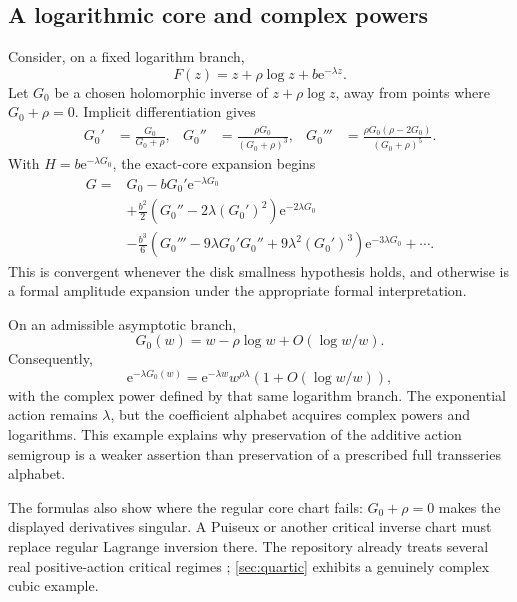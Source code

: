 \documentclass[11pt,a4paper]{article}
\numberwithin{equation}{section}
\theoremstyle{definition}
\theoremstyle{remark}
\newcommand{\e}{\mathrm e}
\begin{document}
\subsection{A logarithmic core and complex powers}

Consider, on a fixed logarithm branch,
\begin{equation}\label{eq:log-model}
 F(z)=z+\rho\log z+b\e^{-\lambda z}.
\end{equation}
Let $G_0$ be a chosen holomorphic inverse of $z+\rho\log z$,
away from points where $G_0+\rho=0$. Implicit differentiation gives
\begin{align}
 G_0'&=\frac{G_0}{G_0+\rho},&
 G_0''&=\frac{\rho G_0}{(G_0+\rho)^3},&
 G_0'''&=\frac{\rho G_0(\rho-2G_0)}{(G_0+\rho)^5}.
 \label{eq:log-core-derivatives}
\end{align}
With $H=b\e^{-\lambda G_0}$, the exact-core expansion begins
\begin{align}
 G={}&G_0-bG_0'\e^{-\lambda G_0}\nonumber\\
 &+\frac{b^2}{2}
       \left(G_0''-2\lambda(G_0')^2\right)
       \e^{-2\lambda G_0}\nonumber\\
 &-\frac{b^3}{6}
       \left(G_0'''-9\lambda G_0'G_0''
                    +9\lambda^2(G_0')^3\right)
       \e^{-3\lambda G_0}+\cdots .
 \label{eq:log-expansion}
\end{align}
This is convergent whenever the disk smallness hypothesis holds,
and otherwise is a formal amplitude expansion under the appropriate
formal interpretation.

On an admissible asymptotic branch,
\[
 G_0(w)=w-\rho\log w+O(\log w/w).
\]
Consequently,
\begin{equation}\label{eq:complex-power-core}
 \e^{-\lambda G_0(w)}
 =\e^{-\lambda w}w^{\rho\lambda}
       \left(1+O(\log w/w)\right),
\end{equation}
with the complex power defined by that same logarithm branch.
The exponential action remains $\lambda$, but the coefficient
alphabet acquires complex powers and logarithms.
This example explains why preservation of the additive action
semigroup is a weaker assertion than preservation of a prescribed
full transseries alphabet.

The formulas also show where the regular core chart fails:
$G_0+\rho=0$ makes the displayed derivatives singular.
A Puiseux or another critical inverse chart must replace regular
Lagrange inversion there. The repository already treats several
real positive-action critical regimes \cite{repo-moving,repo-critical};
\cref{sec:quartic} exhibits a genuinely complex cubic example.
\end{document}
